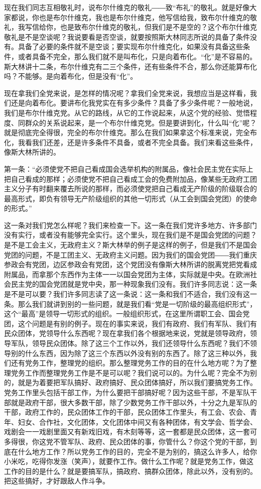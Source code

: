 现在我们同志互相敬礼时，说布尔什维克的敬礼――致“布礼”的敬礼。就是好像大家都说，你也是布尔什维克，我也是布尔什维克，他写信给我，致布尔什维克的敬礼，我写信给你，也是致布尔什维克的敬礼，但我们是不是空的？这个布尔什维克敬礼是不是空谈呢？我说要看是否空谈，就要按照斯大林同志所说的具备了条件没有。具备了必要的条件就不是空谈；要实现布尔什维克化，如果没有具备这些条件，或者具备不完全，那么我们就不是叫布化，只是向着布化。“化”是不容易的。斯大林讲十二条，布尔什维克有二三个条件，还有些条件不合，那么你还能算布化吗？不能够。是向着布化，但是没有“化”。

现在拿我们全党来说，是怎样的情况呢？拿我们全党来说，我想应当是这样看，我们还是向着布化。要讲布化我党实在有多少条件？具备了多少条件呢？一般地说，我们是布尔什维克党。从它的路线，从它的工作说起来，从这个党的经验、觉悟程度、同群众的关系说起来，是一个布尔什维克党。但是要讲到化，什么叫“化”呢？就是彻底完全得很，完全的布尔什维克。那么在我们如果拿这个标准来说，完全布化，我看我们还差，还是许多条件不具备，或者不完全具备。我们来看这些条件，像斯大林所讲的。

第一条：“必须使党不把自己看成国会选举机构的附属品，像社会民主党在实际上把自己看成的那样；必须使党不把自己看成工会的免费附加品，像某些无政府工团主义分子有时翻来覆去所说的那样，而必须使党把自己看成无产阶级的阶级联合的最高形式，即负有领导无产阶级组织的其他一切形式（从工会到国会党团）的使命的形式。”

这一条对我们党怎么样呢？我们来检查一下。这一条在我们党许多地方、许多部门没有实行，或者没有能够完全实行。这个里头，现在我们是不是国会党团的问题？是不是工会主义，无政府主义？斯大林举的例子是这样的例子，但是我们不是国会党团的问题，不是工团主义、无政府主义问题。因为我们的国会党团――我们重庆参政会有党团，边区参政会有党团，这个党团没有像斯大林所讲的脱离党把党看成附属品，而拿那个东西作为主体一一以国会党团为主体，实际就是中央。在欧洲社会民主党的国会党团就是党中央，那一种现象我们没有。我们许多同志说：这一条是不是可以要？我们许多同志读了这一条说：这一条和我们不适合，我们没有这一条。那么我们就讲到别的一些问题，就是我们看“党是一切阶级的最高组织形式”，这个“最高”是领导一切形式的组织。一般组织形式，在这里所谓职工会、国会党团，这个问题是有别的例子。现在的事实来说，我们有政府、我们有军队、我们有民众团体，党领导什么东西呢？现在拿我们各个根据地来说，党就是领导政府，领导军队，领导民众团体。除了这三个工作以外，我们还领导什么东西呢？我们不领导别的什么东西，因为除了这三个东西以外没有别的东西了。除了这三种以外，我们还有党务工作，整理党的组织。那么整理党务工作的目的在什么地方呢？为了整理党务工作而整理党务工作是不是可以呢？我们说可以的。为什么呢？完全不为别的，就是为着要把军队搞好、政府搞好、民众团体搞好，所以我们要搞党务工作。党务工作里头包括干部工作，为什么要把干部搞好呢？因为这些干部，不是军队干部就是政府干部，很大多数干部，除了少数党务工作干部以外，十分之九是军队的干部，政府工作的，民众团体工作的干部，民众团体工作里头，有工会、农会、青年、妇女、合作社，文化团体，文化团体中间又有各种团体，有文学会、哲学会、戏剧会一一戏剧里面又有新戏旧戏，有木刻等等，这一套都是民众团体，这一套可多得很，你这党不管军队、政府、民众团体的事，你管什么？你这个党的干部，到底在什么地方工作？所以党务工作的目的，完全不是为别的，搞这么许多人，给你小米吃，吃得你发涨（笑声），就要作工作。做什么工作呢？就是党务工作，做这工作的目的是什么？就是要搞军队，搞政府、搞群众团体，除此以外，没有别的。把这些搞好，才好跟敌人作斗争。

